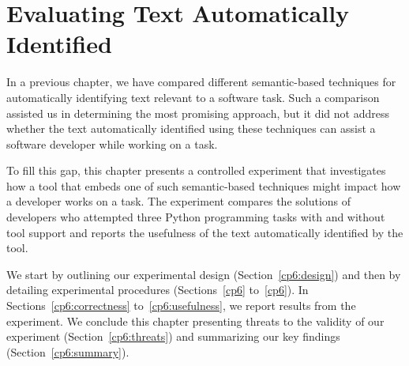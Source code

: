 \setcounter{chapter}{5}
\setcounter{rq}{1}


\chapter{Evaluating Text Automatically Identified}
\label{ch:assisting}




In a previous chapter, we have compared different semantic-based techniques for automatically identifying text relevant to a software task.
Such a comparison assisted us in determining the most promising approach, but it did not address whether 
the text automatically identified  
using these techniques can assist a software developer while working on a task.



To fill this gap, this chapter presents a controlled experiment that 
investigates how a tool that embeds one of such semantic-based techniques 
might impact how a developer works on a task. 
The experiment 
compares the solutions of developers who attempted three Python programming tasks with and without tool support
and reports the usefulness of the text automatically identified by the tool.





We start by outlining our experimental design (Section~\ref{cp6:design}) and then 
by detailing experimental procedures (Sections~\ref{cp6} to~\ref{cp6}).
In Sections~\ref{cp6:correctness} to~\ref{cp6:usefulness}, we report results from the experiment.
We conclude this chapter presenting threats to the validity of our experiment (Section~\ref{cp6:threats}) and 
 summarizing our key findings (Section~\ref{cp6:summary}).


\clearpage














% 





